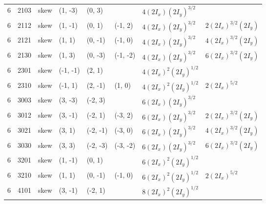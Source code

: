 {{\begin{longtable}{llllllll}
6 & 2103 &   skew &   (1, -3) &   (0, 3) &          &       \colorbox{blue!10}{$4 (2I_x) (2I_y)^ {3/2}$} &                                                   \\
6 & 2112 &   skew &   (1, -1) &   (0, 1) &  (-1, 2) &       \colorbox{blue!10}{$4 (2I_x) (2I_y)^ {3/2}$} &       \colorbox{blue!10}{$2 (2I_x)^ {3/2} (2I_y)$} \\
6 & 2121 &   skew &    (1, 1) &  (0, -1) &  (-1, 0) &       \colorbox{blue!10}{$4 (2I_x) (2I_y)^ {3/2}$} &       \colorbox{blue!10}{$4 (2I_x)^ {3/2} (2I_y)$} \\
6 & 2130 &   skew &    (1, 3) &  (0, -3) & (-1, -2) &       \colorbox{blue!10}{$4 (2I_x) (2I_y)^ {3/2}$} &       \colorbox{blue!10}{$6 (2I_x)^ {3/2} (2I_y)$} \\
6 & 2301 &   skew &  (-1, -1) &   (2, 1) &          &   \colorbox{blue!10}{$4 (2I_x)^ {2} (2I_y)^ {1/2}$} &                                                   \\
6 & 2310 &   skew &   (-1, 1) &  (2, -1) &   (1, 0) &   \colorbox{blue!10}{$4 (2I_x)^ {2} (2I_y)^ {1/2}$} &           \colorbox{orange!10}{$2 (2I_x)^ {5/2} $} \\
6 & 3003 &   skew &   (3, -3) &  (-2, 3) &          &       \colorbox{blue!10}{$6 (2I_x) (2I_y)^ {3/2}$} &                                                   \\
6 & 3012 &   skew &   (3, -1) &  (-2, 1) &  (-3, 2) &       \colorbox{blue!10}{$6 (2I_x) (2I_y)^ {3/2}$} &       \colorbox{blue!10}{$2 (2I_x)^ {3/2} (2I_y)$} \\
6 & 3021 &   skew &    (3, 1) & (-2, -1) &  (-3, 0) &       \colorbox{blue!10}{$6 (2I_x) (2I_y)^ {3/2}$} &       \colorbox{blue!10}{$4 (2I_x)^ {3/2} (2I_y)$} \\
6 & 3030 &   skew &    (3, 3) & (-2, -3) & (-3, -2) &       \colorbox{blue!10}{$6 (2I_x) (2I_y)^ {3/2}$} &       \colorbox{blue!10}{$6 (2I_x)^ {3/2} (2I_y)$} \\
6 & 3201 &   skew &   (1, -1) &   (0, 1) &          &   \colorbox{blue!10}{$6 (2I_x)^ {2} (2I_y)^ {1/2}$} &                                                   \\
6 & 3210 &   skew &    (1, 1) &  (0, -1) &  (-1, 0) &   \colorbox{blue!10}{$6 (2I_x)^ {2} (2I_y)^ {1/2}$} &           \colorbox{orange!10}{$2 (2I_x)^ {5/2} $} \\
6 & 4101 &   skew &   (3, -1) &  (-2, 1) &          &   \colorbox{blue!10}{$8 (2I_x)^ {2} (2I_y)^ {1/2}$} &                                                   \\

\end{longtable}}}
